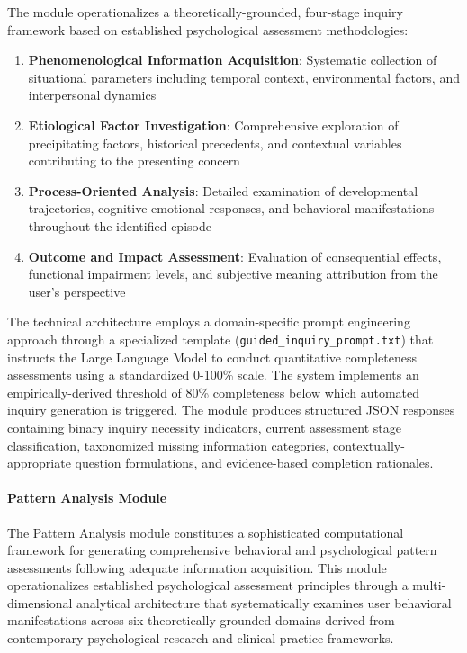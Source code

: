 The module operationalizes a theoretically-grounded, four-stage inquiry framework based on established psychological assessment methodologies:

\begin{enumerate}
\item \textbf{Phenomenological Information Acquisition}: Systematic collection of situational parameters including temporal context, environmental factors, and interpersonal dynamics
\item \textbf{Etiological Factor Investigation}: Comprehensive exploration of precipitating factors, historical precedents, and contextual variables contributing to the presenting concern
\item \textbf{Process-Oriented Analysis}: Detailed examination of developmental trajectories, cognitive-emotional responses, and behavioral manifestations throughout the identified episode
\item \textbf{Outcome and Impact Assessment}: Evaluation of consequential effects, functional impairment levels, and subjective meaning attribution from the user's perspective
\end{enumerate}

The technical architecture employs a domain-specific prompt engineering approach through a specialized template (\texttt{guided\_inquiry\_prompt.txt}) that instructs the Large Language Model to conduct quantitative completeness assessments using a standardized 0-100\% scale. The system implements an empirically-derived threshold of 80\% completeness below which automated inquiry generation is triggered. The module produces structured JSON responses containing binary inquiry necessity indicators, current assessment stage classification, taxonomized missing information categories, contextually-appropriate question formulations, and evidence-based completion rationales.

\paragraph{Pattern Analysis Module}

The Pattern Analysis module constitutes a sophisticated computational framework for generating comprehensive behavioral and psychological pattern assessments following adequate information acquisition. This module operationalizes established psychological assessment principles through a multi-dimensional analytical architecture that systematically examines user behavioral manifestations across six theoretically-grounded domains derived from contemporary psychological research and clinical practice frameworks.

